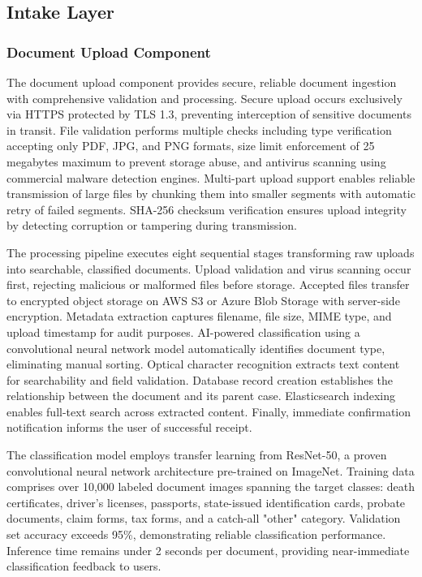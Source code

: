 \subsection{Intake Layer}

\subsubsection{Document Upload Component}

The document upload component provides secure, reliable document ingestion with comprehensive validation and processing. Secure upload occurs exclusively via HTTPS protected by TLS 1.3, preventing interception of sensitive documents in transit. File validation performs multiple checks including type verification accepting only PDF, JPG, and PNG formats, size limit enforcement of 25 megabytes maximum to prevent storage abuse, and antivirus scanning using commercial malware detection engines. Multi-part upload support enables reliable transmission of large files by chunking them into smaller segments with automatic retry of failed segments. SHA-256 checksum verification ensures upload integrity by detecting corruption or tampering during transmission.

The processing pipeline executes eight sequential stages transforming raw uploads into searchable, classified documents. Upload validation and virus scanning occur first, rejecting malicious or malformed files before storage. Accepted files transfer to encrypted object storage on AWS S3 or Azure Blob Storage with server-side encryption. Metadata extraction captures filename, file size, MIME type, and upload timestamp for audit purposes. AI-powered classification using a convolutional neural network model automatically identifies document type, eliminating manual sorting. Optical character recognition extracts text content for searchability and field validation. Database record creation establishes the relationship between the document and its parent case. Elasticsearch indexing enables full-text search across extracted content. Finally, immediate confirmation notification informs the user of successful receipt.

The classification model employs transfer learning from ResNet-50, a proven convolutional neural network architecture pre-trained on ImageNet. Training data comprises over 10,000 labeled document images spanning the target classes: death certificates, driver's licenses, passports, state-issued identification cards, probate documents, claim forms, tax forms, and a catch-all "other" category. Validation set accuracy exceeds 95\%, demonstrating reliable classification performance. Inference time remains under 2 seconds per document, providing near-immediate classification feedback to users.

